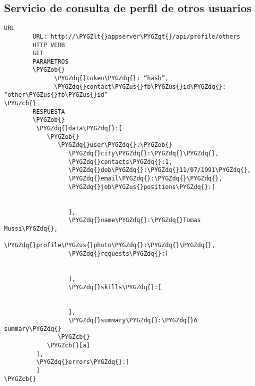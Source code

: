 \documentclass[a4paper,10pt,spanish]{sphinxmanual}
\def\PYGZus{\char`\_}
\def\PYGZob{\char`\{}
\def\PYGZcb{\char`\}}
\def\PYGZlt{\char`\<}
\def\PYGZgt{\char`\>}
\def\PYGZdq{\char`\"}
\begin{document}
\subsection{Servicio de consulta de perfil de otros usuarios}
\label{apiRest:servicio-de-consulta-de-perfil-de-otros-usuarios}
\begin{Verbatim}[commandchars=\\\{\}]
URL
        URL: http://\PYGZlt{}appserver\PYGZgt{}/api/profile/others
        HTTP VERB
        GET
        PARAMETROS
        \PYGZob{}
              \PYGZdq{}token\PYGZdq{}: “hash”,
              \PYGZdq{}contact\PYGZus{}fb\PYGZus{}id\PYGZdq{}: “other\PYGZus{}fb\PYGZus{}id”
\PYGZcb{}
        RESPUESTA
        \PYGZob{}
         \PYGZdq{}data\PYGZdq{}:[
            \PYGZob{}
               \PYGZdq{}user\PYGZdq{}:\PYGZob{}
                  \PYGZdq{}city\PYGZdq{}:\PYGZdq{}\PYGZdq{},
                  \PYGZdq{}contacts\PYGZdq{}:1,
                  \PYGZdq{}dob\PYGZdq{}:\PYGZdq{}11/07/1991\PYGZdq{},
                  \PYGZdq{}email\PYGZdq{}:\PYGZdq{}\PYGZdq{},
                  \PYGZdq{}job\PYGZus{}positions\PYGZdq{}:[


                  ],
                  \PYGZdq{}name\PYGZdq{}:\PYGZdq{}Tomas Mussi\PYGZdq{},
                  \PYGZdq{}profile\PYGZus{}photo\PYGZdq{}:\PYGZdq{}\PYGZdq{},
                  \PYGZdq{}requests\PYGZdq{}:[


                  ],
                  \PYGZdq{}skills\PYGZdq{}:[


                  ],
                  \PYGZdq{}summary\PYGZdq{}:\PYGZdq{}A summary\PYGZdq{}
               \PYGZcb{}
            \PYGZcb{}[a]
         ],
         \PYGZdq{}errors\PYGZdq{}:[
         ]
\PYGZcb{}
\end{Verbatim}
\end{document}
